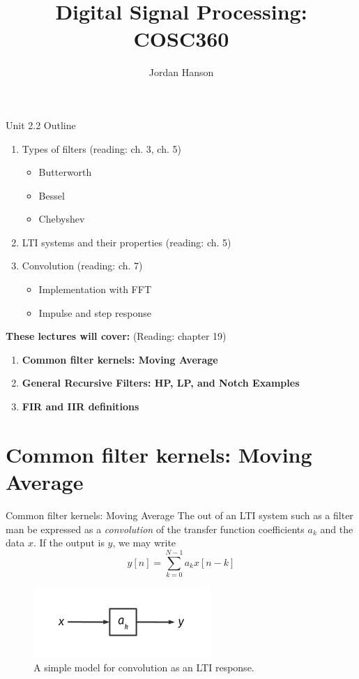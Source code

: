 \documentclass{beamer}
\title{Digital Signal Processing: COSC360}
\author{Jordan Hanson}
\institute{Whittier College Department of Physics and Astronomy}
\begin{document}
\maketitle

\begin{frame}{Unit 2.2 Outline}
\begin{enumerate}
\item Types of filters (reading: ch. 3, ch. 5)
\begin{itemize}
\item Butterworth
\item Bessel
\item Chebyshev
\end{itemize}
\item LTI systems and their properties (reading: ch. 5)
\item Convolution (reading: ch. 7)
\begin{itemize}
\item Implementation with FFT
\item Impulse and step response
\end{itemize}
\end{enumerate}
\textbf{These lectures will cover:} (Reading: chapter 19)
\begin{enumerate}
\item \textbf{Common filter kernels: Moving Average}
\item \textbf{General Recursive Filters: HP, LP, and Notch Examples}
\item \textbf{FIR and IIR definitions}
\end{enumerate}
\end{frame}

\section{Common filter kernels: Moving Average}

\begin{frame}{Common filter kernels: Moving Average}
The out of an LTI system such as a filter man be expressed as a \textit{convolution} of the transfer function coefficients $a_k$ and the data $x$. If the output is $y$, we may write
\begin{equation}
y[n] = \sum_{k=0}^{N-1} a_k x[n-k]
\end{equation}
\begin{figure}
\centering
\includegraphics[width=0.6\textwidth]{figures/kernel1.pdf}
\caption{\label{fig:kernel1} A simple model for convolution as an LTI response.}
\end{figure}
\end{frame}
\end{document}
